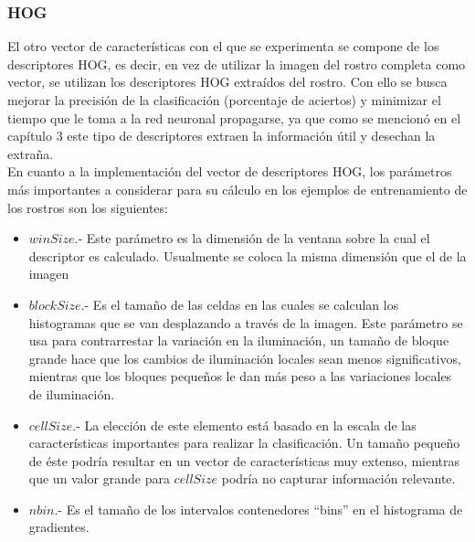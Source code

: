 \subsubsection{HOG}
El otro vector de características con el que se experimenta se compone de los descriptores HOG, es decir, en vez de utilizar la imagen del rostro completa como vector, se utilizan los descriptores HOG extraídos del rostro. Con ello se busca mejorar la precisión de la clasificación (porcentaje de aciertos) y minimizar el tiempo que le toma a la red neuronal propagarse, ya que como se mencionó en el capítulo 3 este tipo de descriptores extraen la información útil y desechan la extraña.\\

En cuanto a la implementación del vector de descriptores HOG, los parámetros más importantes a considerar para su cálculo  en los ejemplos de entrenamiento de los rostros son los siguientes:
\begin{itemize}
	\item $winSize$.- Este parámetro es la dimensión de la ventana sobre la cual el descriptor es calculado. Usualmente se coloca la misma dimensión que el de la imagen
	\item $blockSize$.- Es el tamaño de las celdas en las cuales se calculan los histogramas que se van desplazando a través de la imagen. Este parámetro se usa para contrarrestar la variación en la iluminación, un tamaño de bloque grande hace que los cambios de iluminación locales sean menos significativos, mientras que los bloques pequeños le dan más peso a las variaciones locales de iluminación.
	\item $cellSize$.- La elección de este elemento está basado en la escala de las características importantes para realizar la clasificación. Un tamaño pequeño de éste podría resultar en un vector de características muy extenso, mientras que un valor grande para $cellSize$ podría no capturar información relevante.
	\item $nbin$.- Es el tamaño de los intervalos contenedores ``bins'' en el histograma de gradientes.
\end{itemize}



	
